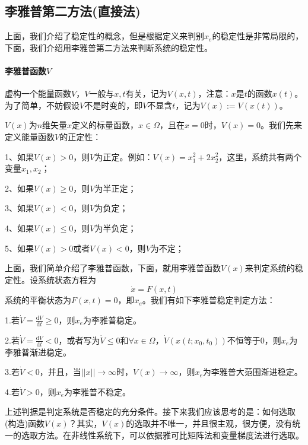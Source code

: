     \subsection{李雅普第二方法(直接法)}
        上面，我们介绍了稳定性的概念，但是根据定义来判别$x_e$的稳定性是非常局限的，下面，我们介绍用李雅普第二方法来判断系统的稳定性。
        \paragraph{李雅普函数$V$}虚构一个能量函数$V$，$V$一般与$x,t$有关，记为$V(x,t)$，注意：$x$是$t$的函数$x(t)$。为了简单，不妨假设$V$不是时变的，即$V$不显含$t$，记为$V(x):=V(x(t))$。
        \par
        $V(x)$为$n$维矢量$x$定义的标量函数，$x\in \varOmega$，且在$x=0$时，$V(x)=0$。我们先来定义能量函数$V$的正定性：
        \par
        1、如果$V(x)>0$，则$V$为正定。例如：$V(x)=x_1^2+2x_2^2$，这里，系统共有两个变量$x_1,x_2$；
        \par
        2、如果$V(x)\geq0$，则$V$为半正定；
        \par
        3、如果$V(x)<0$，则$V$为负定；
        \par
        4、如果$V(x)\leq 0$，则$V$为半负定；
        \par
        5、如果$V(x)> 0$或者$V(x)< 0$，则$V$为不定；
        \par
        上面，我们简单介绍了李雅普函数，下面，就用李雅普函数$V(x)$来判定系统的稳定性。设系统状态方程为
        \[
            \dot{x}=F(x,t)
        \]
        系统的平衡状态为$F(x,t)=0$，即$x_e$。我们有如下李雅普稳定判定方法：
        \par
        1.若$\dot{V}=\frac{\mathrm{d}V}{\mathrm{d}t}\geq0$，则$x_e$为李雅普稳定。
        \par
        2.若$\dot{V}=\frac{\mathrm{d}V}{\mathrm{d}t}<0$，或者写为$\dot{V}\leq0$和$\forall x\in \varOmega$，$\dot{V}(x(t;x_0,t_0))$不恒等于0，则$x_e$为李雅普渐进稳定。
        \par
        3.若$\dot{V}<0$，并且，当$||x||\rightarrow\infty$时，$V(x)\rightarrow\infty$，则$x_e$为李雅普大范围渐进稳定。
        \par
        4.若$\dot{V}>0$，则$x_e$为李雅普不稳定。
        \par
        上述判据是判定系统是否稳定的充分条件。接下来我们应该思考的是：如何选取(构造)函数$V(x)$？其实，$V(x)$的选取并不唯一，并且很主观，很方便，没有统一的选取方法。在非线性系统下，可以依据雅可比矩阵法和变量梯度法进行选取。

